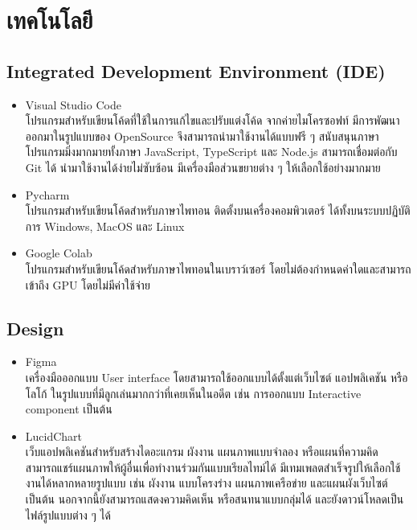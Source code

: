 \documentclass[14pt,oneside,openright,a4paper]{cpe-thai-project}
\begin{document}
\newpage

\section{เทคโนโลยี}
  \subsection{Integrated Development Environment (IDE)}

    \begin{itemize}
      \item Visual Studio Code \cite{VSCode} \\ 
        โปรแกรมสำหรับเขียนโค้ดที่ใช้ในการแก้ไขและปรับแต่งโค้ด จากค่ายไมโครซอฟท์ มีการพัฒนาออกมาในรูปแบบของ OpenSource จึงสามารถนำมาใช้งานได้แบบฟรี ๆ สนับสนุนภาษาโปรแกรมมิ่งมากมายทั้งภาษา JavaScript, TypeScript และ Node.js สามารถเชื่อมต่อกับ Git ได้ นำมาใช้งานได้ง่ายไม่ซับซ้อน มีเครื่องมือส่วนขยายต่าง ๆ ให้เลือกใช้อย่างมากมาย
      \item Pycharm \cite{Pycharm} \\ 
        โปรแกรมสำหรับเขียนโค้ดสำหรับภาษาไพทอน ติดตั้งบนเครื่องคอมพิวเตอร์ ได้ทั้งบนระบบปฏิบัติการ Windows, MacOS และ Linux 
      \item Google Colab \cite{Colab} \\ 
        โปรแกรมสำหรับเขียนโค้ดสำหรับภาษาไพทอนในเบราว์เซอร์ โดยไม่ต้องกำหนดค่าใดและสามารถเข้าถึง GPU โดยไม่มีค่าใช้จ่าย
    \end{itemize}

  \subsection{Design}
    \begin{itemize}
      \item Figma \cite{Figma} \\ 
        เครื่องมือออกแบบ User interface โดยสามารถใช้ออกแบบได้ตั้งแต่เว็บไซต์ แอปพลิเคชัน หรือโลโก้ ในรูปแบบที่มีลูกเล่นมากกว่าที่เคยเห็นในอดีต เช่น การออกแบบ Interactive component เป็นต้น
      \item LucidChart \cite{Lucidchart} \\ 
        เว็บแอปพลิเคชันสำหรับสร้างไดอะแกรม ผังงาน แผนภาพแบบจำลอง หรือแผนที่ความคิด สามารถแชร์แผนภาพให้ผู้อื่นเพื่อทำงานร่วมกันแบบเรียลไทม์ได้ มีเทมเพลตสำเร็จรูปให้เลือกใช้งานได้หลากหลายรูปแบบ เช่น ผังงาน แบบโครงร่าง แผนภาพเครือข่าย และแผนผังเว็บไซต์ เป็นต้น นอกจากนี้ยังสามารถแสดงความคิดเห็น หรือสนทนาแบบกลุ่มได้ และยังดาวน์โหลดเป็นไฟล์รูปแบบต่าง ๆ ได้
    \end{itemize}
\end{document}
